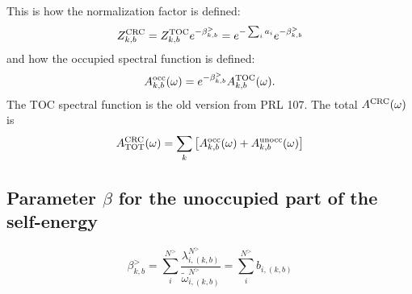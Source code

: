\documentclass[a4paper,12pt]{article}
\begin{document}
This is how the normalization factor is defined: 
\begin{equation}
  Z_{k,b}^\textnormal{CRC} = Z_{k,b}^\textnormal{TOC} e^{ - \beta_{k,b}^> } =  e^{ - \sum_i a_i }  e^{ - \beta_{k,b}^> } 
\end{equation}
and how the occupied spectral function is defined:
\begin{equation}
  A_{k,b}^\textnormal{occ}(\omega) = e^{ - \beta_{k,b}^> } A_{k,b}^\textnormal{TOC}(\omega) .
\end{equation}
The TOC spectral function is the old version from PRL 107. 
The total $A^\textnormal{CRC}(\omega)$ is 
\begin{equation}
   A_\textnormal{TOT}^\textnormal{CRC}(\omega) = \sum_k \left[ A_{k,b}^\textnormal{occ}(\omega) + A_{k,b}^\textnormal{unocc}(\omega) \right]
\end{equation}

\subsection{Parameter $\beta$ for the unoccupied part of the self-energy}

\begin{equation}
 \beta_{k,b}^>  = \sum_i^{N^>} \frac{\lambda_{i,(k,b)}^{N^>}}{\tilde\omega_{i,(k,b)}^{N^>}} = \sum_i^{N^>} b_{i,(k,b)}
\end{equation}
\end{document}
